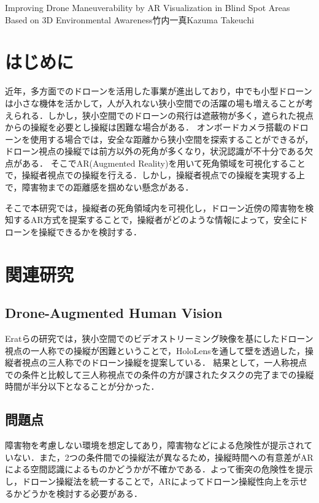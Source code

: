 \documentclass[a4paper,10pt,twocolumn,upLatex]{jsarticle}
\date{20}		%
\begin{document}
{Improving Drone Maneuverability by AR Visualization in Blind Spot Areas Based on 3D Environmental Awareness}{竹内一真}{Kazuma} {Takeuchi}


\section{はじめに}
近年，多方面でのドローンを活用した事業が進出しており，中でも小型ドローンは小さな機体を活かして，人が入れない狭小空間での活躍の場も増えることが考えられる．しかし，狭小空間でのドローンの飛行は遮蔽物が多く，遮られた視点からの操縦を必要とし操縦は困難な場合がある．
オンボードカメラ搭載のドローンを使用する場合では，安全な距離から狭小空間を探索することができるが，ドローン視点の操縦では前方以外の死角が多くなり，状況認識が不十分である\cite{FPV}欠点がある．
そこでAR(Augmented Reality)を用いて死角領域を可視化することで，操縦者視点での操縦を行える．しかし，操縦者視点での操縦を実現する上で，障害物までの距離感を掴めない懸念がある．
\par
そこで本研究では，操縦者の死角領域内を可視化し，ドローン近傍の障害物を検知するAR方式を提案することで，操縦者がどのような情報によって，安全にドローンを操縦できるかを検討する．

\section{関連研究}
\subsection{Drone-Augmented Human Vision}
Eratらの研究では，狭小空間でのビデオストリーミング映像を基にしたドローン視点の一人称での操縦が困難ということで，HoloLensを通して壁を透過した，操縦者視点の三人称でのドローン操縦を提案している\cite{AR_drone}．
結果として，一人称視点での条件と比較して三人称視点での条件の方が課されたタスクの完了までの操縦時間が半分以下となることが分かった．

\subsection{問題点}
障害物を考慮しない環境を想定してあり，障害物などによる危険性が提示されていない．また，2つの条件間での操縦法が異なるため，操縦時間への有意差がARによる空間認識によるものかどうかが不確かである．よって衝突の危険性を提示し，ドローン操縦法を統一することで，ARによってドローン操縦性向上を示せるかどうかを検討する必要がある．
\end{document}
